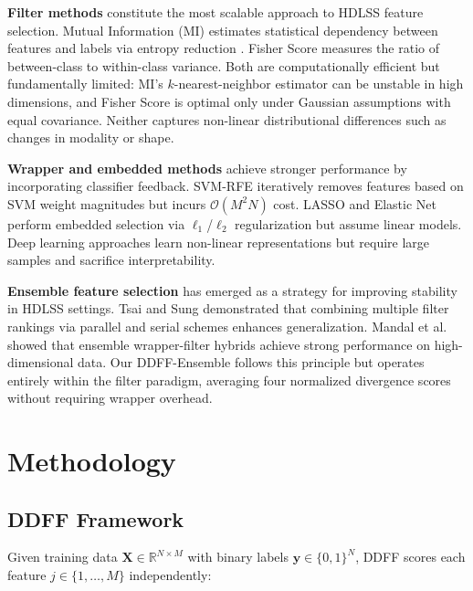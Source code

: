 \documentclass[conference]{IEEEtran}
\begin{document}
\textbf{Filter methods} constitute the most scalable approach to HDLSS feature selection. Mutual Information (MI) estimates statistical dependency between features and labels via entropy reduction \cite{Peng2005mRMR}. Fisher Score \cite{Fisher1936LDA} measures the ratio of between-class to within-class variance. Both are computationally efficient but fundamentally limited: MI's $k$-nearest-neighbor estimator can be unstable in high dimensions, and Fisher Score is optimal only under Gaussian assumptions with equal covariance. Neither captures non-linear distributional differences such as changes in modality or shape.

\textbf{Wrapper and embedded methods} achieve stronger performance by incorporating classifier feedback. SVM-RFE \cite{Guyon2002SVMRFE} iteratively removes features based on SVM weight magnitudes but incurs $\mathcal{O}(M^2 N)$ cost. LASSO \cite{Tibshirani1996LASSO} and Elastic Net \cite{Zou2005ElasticNet} perform embedded selection via $\ell_1$/$\ell_2$ regularization but assume linear models. Deep learning approaches \cite{Liu2017DeepNNA, Mustafa2023AnEFB} learn non-linear representations but require large samples and sacrifice interpretability.

\textbf{Ensemble feature selection} has emerged as a strategy for improving stability in HDLSS settings. Tsai and Sung \cite{tsai2020ensemble} demonstrated that combining multiple filter rankings via parallel and serial schemes enhances generalization. Mandal et al.\ \cite{mandal2024feature} showed that ensemble wrapper-filter hybrids achieve strong performance on high-dimensional data. Our DDFF-Ensemble follows this principle but operates entirely within the filter paradigm, averaging four normalized divergence scores without requiring wrapper overhead.

\section{Methodology}
\label{sec:method}

\subsection{DDFF Framework}

Given training data $\mathbf{X} \in \mathbb{R}^{N \times M}$ with binary labels $\mathbf{y} \in \{0,1\}^N$, DDFF scores each feature $j \in \{1, \ldots, M\}$ independently:
\end{document}
